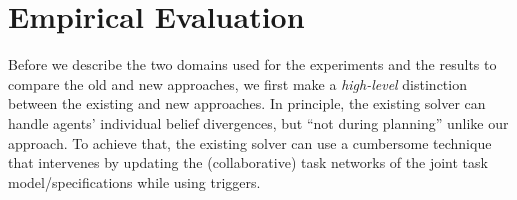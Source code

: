 \documentclass[letterpaper]{article} %
\begin{document}











\section{Empirical Evaluation}

Before we describe the two domains used for the experiments and the results to compare the old and new approaches, we first make a \textit{high-level} distinction between the existing and new approaches. 
In principle, the existing solver can handle agents' individual belief divergences, but ``not during planning'' unlike our approach. To achieve that, the existing solver can use a cumbersome technique that intervenes by updating the (collaborative) task networks of the joint task model/specifications while using triggers.
\end{document}
